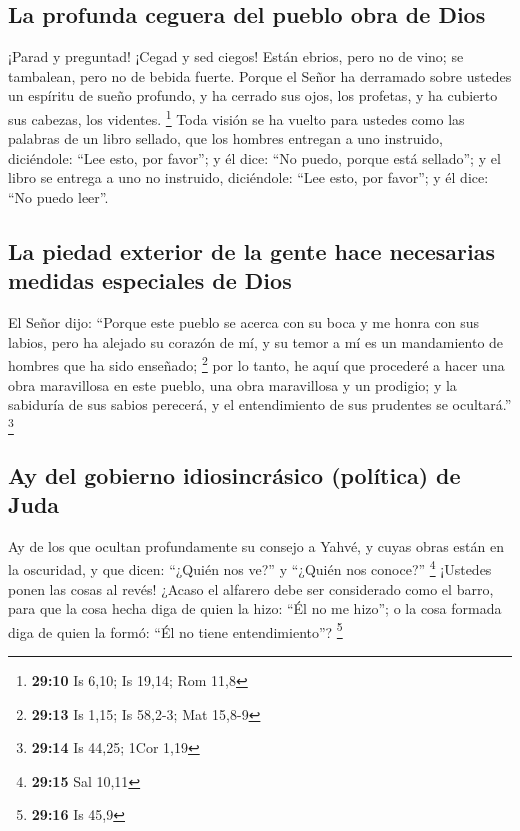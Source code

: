 \hypertarget{la-profunda-ceguera-del-pueblo-obra-de-dios}{%
\subsection{La profunda ceguera del pueblo obra de
Dios}\label{la-profunda-ceguera-del-pueblo-obra-de-dios}}

 ¡Parad y preguntad! ¡Cegad y sed ciegos! Están ebrios,
pero no de vino; se tambalean, pero no de bebida fuerte. 
Porque el Señor ha derramado sobre ustedes un espíritu de sueño
profundo, y ha cerrado sus ojos, los profetas, y ha cubierto sus
cabezas, los videntes. \footnote{\textbf{29:10} Is 6,10; Is 19,14; Rom
  11,8}  Toda visión se ha vuelto para ustedes como las
palabras de un libro sellado, que los hombres entregan a uno instruido,
diciéndole: ``Lee esto, por favor''; y él dice: ``No puedo, porque está
sellado'';  y el libro se entrega a uno no instruido,
diciéndole: ``Lee esto, por favor''; y él dice: ``No puedo leer''.

\hypertarget{la-piedad-exterior-de-la-gente-hace-necesarias-medidas-especiales-de-dios}{%
\subsection{La piedad exterior de la gente hace necesarias medidas
especiales de
Dios}\label{la-piedad-exterior-de-la-gente-hace-necesarias-medidas-especiales-de-dios}}

 El Señor dijo: ``Porque este pueblo se acerca con su
boca y me honra con sus labios, pero ha alejado su corazón de mí, y su
temor a mí es un mandamiento de hombres que ha sido enseñado;
\footnote{\textbf{29:13} Is 1,15; Is 58,2-3; Mat 15,8-9} 
por lo tanto, he aquí que procederé a hacer una obra maravillosa en este
pueblo, una obra maravillosa y un prodigio; y la sabiduría de sus sabios
perecerá, y el entendimiento de sus prudentes se ocultará.'' \footnote{\textbf{29:14}
  Is 44,25; 1Cor 1,19}

\hypertarget{ay-del-gobierno-idiosincruxe1sico-poluxedtica-de-juda}{%
\subsection{Ay del gobierno idiosincrásico (política) de
Juda}\label{ay-del-gobierno-idiosincruxe1sico-poluxedtica-de-juda}}

 Ay de los que ocultan profundamente su consejo a Yahvé,
y cuyas obras están en la oscuridad, y que dicen: ``¿Quién nos ve?'' y
``¿Quién nos conoce?'' \footnote{\textbf{29:15} Sal 10,11}
 ¡Ustedes ponen las cosas al revés! ¿Acaso el alfarero
debe ser considerado como el barro, para que la cosa hecha diga de quien
la hizo: ``Él no me hizo''; o la cosa formada diga de quien la formó:
``Él no tiene entendimiento''? \footnote{\textbf{29:16} Is 45,9}

